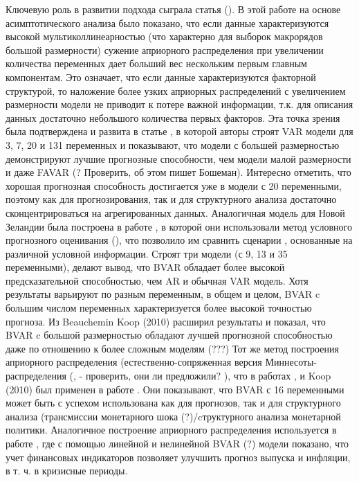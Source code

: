 \documentclass[11pt]{article} %
\begin{document}
Ключевую роль в развитии подхода сыграла статья (\cite{de_mol_al_2008_forecasting}). В этой работе на основе асимптотического анализа было показано, что если данные характеризуются высокой мультиколлинеарностью (что характерно для выборок макрорядов большой размерности) сужение априорного распределения при увеличении количества переменных дает больший вес нескольким первым главным компонентам.  Это означает, что если данные характеризуются факторной структурой, то наложение более узких априорных распределений с увеличением размерности модели  не  приводит к потере важной информации, т.к. для описания данных достаточно небольшого количества первых факторов.  Эта точка зрения  была подтверждена и развита в статье \cite{banbura_al_2010_large}, в которой авторы  строят VAR модели для 3, 7, 20 и 131 переменных и показывают, что модели с большей размерностью демонстрируют лучшие прогнозные способности, чем модели малой размерности и даже FAVAR (? Проверить, об этом пишет Бошеман). Интересно отметить, что хорошая прогнозная способность достигается уже в модели с 20  переменными, поэтому как для прогнозирования, так и для структурного анализа достаточно сконцентрироваться на агрегированных данных.
Аналогичная модель для Новой Зеландии была построена в работе \cite{bloor_matheson_2010_analysing}, в которой они использовали метод условного прогнозного оценивания (\cite{waggoner_zha_1999_conditional}), что позволило им сравнить сценарии , основанные на различной условной информации.  Строят три модели (с 9, 13 и 35 переменными), делают вывод, что BVAR обладает более высокой предсказательной способностью, чем AR и обычная VAR модель.  Хотя результаты варьируют по разным переменным, в общем и целом, BVAR c большим числом переменных характеризуется более высокой точностью прогноза.
Из Beauchemin
Koop (2010) расширил результаты \cite{banbura_al_2010_large}  и показал, что BVAR c большой размерностью обладают лучшей прогнозной способностью даже по отношению  к более сложным моделям (???)
Тот же метод построения априорного распределения (естественно-сопряженная версия Миннесоты-распределения (\cite{kadiyala_karlsson_1997_numerical},  \cite{sims_zha_1998_bayesian}- проверить, они ли предложили? ), что в работах \cite{banbura_al_2010_large} , \cite{bloor_matheson_2010_analysing} и Koop (2010) был применен в работе \cite{beauchemin_zaman_2011_medium}. Они показывают, что BVAR с 16 переменными может быть с успехом использована как для прогнозов, так и для структурного анализа (трансмиссии монетарного шока (?)/cтруктурного анализа монетарной политики. Аналогичное построение априорного распределения используется в работе  \cite{alessandri_mumtaz_2014}, где с помощью линейной и нелинейной BVAR (?) модели показано, что учет финансовых индикаторов позволяет улучшить прогноз выпуска и инфляции, в т. ч. в кризисные периоды.
\end{document}
